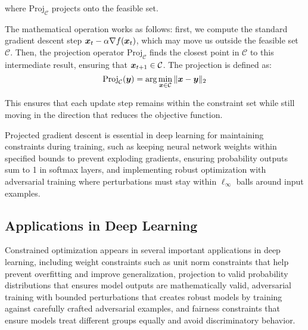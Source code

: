 where $\text{Proj}_{\mathcal{C}}$ projects onto the feasible set.

The mathematical operation works as follows: first, we compute the standard gradient descent step $\boldsymbol{x}_t - \alpha \nabla f(\boldsymbol{x}_t)$, which may move us outside the feasible set $\mathcal{C}$. Then, the projection operator $\text{Proj}_{\mathcal{C}}$ finds the closest point in $\mathcal{C}$ to this intermediate result, ensuring that $\boldsymbol{x}_{t+1} \in \mathcal{C}$. The projection is defined as:
\begin{equation}
\text{Proj}_{\mathcal{C}}(\boldsymbol{y}) = \arg\min_{\boldsymbol{x} \in \mathcal{C}} \|\boldsymbol{x} - \boldsymbol{y}\|_2
\end{equation}

This ensures that each update step remains within the constraint set while still moving in the direction that reduces the objective function.

\begin{remark}
Projected gradient descent is essential in deep learning for maintaining constraints during training, such as keeping neural network weights within specified bounds to prevent exploding gradients, ensuring probability outputs sum to 1 in softmax layers, and implementing robust optimization with adversarial training where perturbations must stay within $\ell_\infty$ balls around input examples.
\end{remark}

\subsection{Applications in Deep Learning}

Constrained optimization appears in several important applications in deep learning, including weight constraints such as unit norm constraints that help prevent overfitting and improve generalization, projection to valid probability distributions that ensures model outputs are mathematically valid, adversarial training with bounded perturbations that creates robust models by training against carefully crafted adversarial examples, and fairness constraints that ensure models treat different groups equally and avoid discriminatory behavior.
